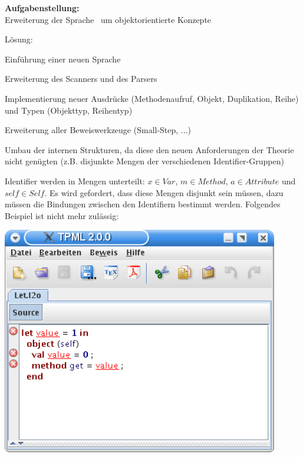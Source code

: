 {
  \textbf{Aufgabenstellung:}\\[2mm]
  Erweiterung der Sprache \LTWO\ um objektorientierte Konzepte

  {
    \begin{itemgroup}{Lösung:}
      \item Einführung einer neuen Sprache \LTWOO
      \item Erweiterung des Scanners und des Parsers
      \item Implementierung neuer Ausdrücke (Methodenaufruf, Objekt, Duplikation, Reihe)
            und Typen (Objekttyp, Reihentyp)
      \item Erweiterung aller Beweiswerkzeuge (Small-Step, ...)
      \item Umbau der internen Strukturen, da diese den neuen Anforderungen der
            Theorie nicht genügten (z.B. disjunkte Mengen der verschiedenen Identifier-Gruppen)
    \end{itemgroup}
  }
}

{
  Identifier werden in Mengen unterteilt: $x \in Var$, $m \in Method$, $a \in Attribute$ 
  und $self \in Self$. Es wird gefordert, dass diese Mengen disjunkt sein müssen,
  dazu müssen die Bindungen zwischen den Identifiern bestimmt werden. Folgendes
  Beispiel ist nicht mehr zulässig:

  \begin{center}
    \includegraphics[height=10cm]{images/object_disjunction.png}
  \end{center}
}

